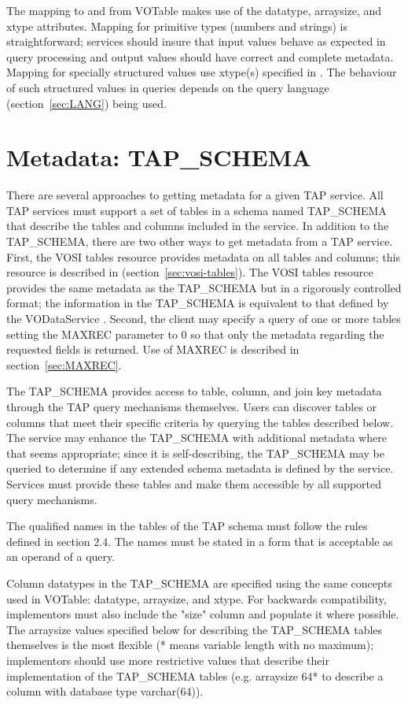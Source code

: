 \documentclass[11pt,letter]{ivoa}
\begin{document}
The mapping to and from VOTable makes use of the datatype, arraysize, and xtype 
attributes. Mapping for primitive types (numbers and strings) is 
straightforward; services should insure that input values behave as 
expected in query processing and output values should have correct and complete 
metadata. Mapping for specially structured values use xtype(s) specified
in \citep{std:DALI}. The behaviour of such structured values in queries depends 
on the query language (section~\ref{sec:LANG}) being used. 

\section{Metadata: TAP\_SCHEMA}
\label{sec:tap-schema}

There are several approaches to getting metadata for a given TAP service. All 
TAP services must support a set of tables in a schema named 
TAP\_SCHEMA that describe the tables and columns included in the 
service. In addition to the TAP\_SCHEMA, there are two other ways 
to get metadata from a TAP service. First, the VOSI tables resource provides 
metadata on all tables and columns; this resource is described in 
(section~\ref{sec:vosi-tables}). The 
VOSI tables resource provides the same metadata as the TAP\_SCHEMA 
but in a rigorously controlled format; the information in the 
TAP\_SCHEMA is equivalent to that defined by the  VODataService 
\citep{std:VODS11}. Second, the client may specify a query of one or more 
tables setting the 
MAXREC parameter to 0 so that only the metadata regarding the requested fields 
is returned. Use of MAXREC is described in section~\ref{sec:MAXREC}.

The TAP\_SCHEMA provides access to table, column, and join key 
metadata through the TAP query mechanisms themselves. Users can discover tables 
or columns that meet their specific criteria by querying the tables described 
below.  The service may enhance the TAP\_SCHEMA with additional 
metadata where that seems appropriate; since it is self-describing, the 
TAP\_SCHEMA may be queried to determine if any extended schema 
metadata is defined by the service. Services must provide these tables and make 
them accessible by all supported query mechanisms.

The qualified names in the tables of the TAP schema must follow the rules 
defined in section 2.4. The names must be stated in a form that is acceptable as 
an operand of a query.

Column datatypes in the TAP\_SCHEMA are specified using the same concepts used in 
VOTable: datatype, arraysize, and xtype. For backwards compatibility, implementors
must also include the "size" column and populate it where possible. The arraysize values
specified below for describing the TAP\_SCHEMA tables themselves is the most flexible 
(* means variable length with no maximum); implementors should use more restrictive values
that describe their implementation of the TAP\_SCHEMA tables (e.g. arraysize 64* to describe
a column with database type varchar(64)).
\end{document}
